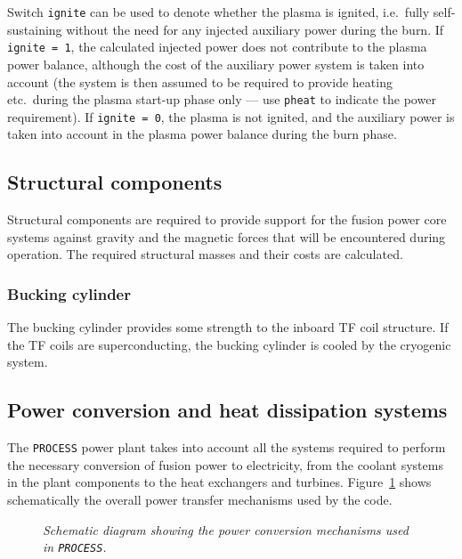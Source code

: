 \documentclass[11pt,a4paper]{report}
\newcommand{\process}{\mbox{\texttt{PROCESS}}}
\begin{document}
Switch \texttt{ignite} can be used to denote whether the plasma is ignited,
i.e.\ fully self-sustaining without the need for any injected auxiliary power
during the burn. If \texttt{ignite = 1}, the calculated injected power does not
contribute to the plasma power balance, although the cost of the auxiliary
power system is taken into account (the system is then assumed to be required to
provide heating etc.\ during the plasma start-up phase only --- use
\texttt{pheat} to indicate the power requirement). If
\texttt{ignite = 0}, the plasma is not ignited, and the auxiliary power is
taken into account in the plasma power balance during the burn phase.

\subsection{Structural components}

Structural components are required to provide support for the fusion power
core systems against gravity and the magnetic forces that will be encountered
during operation. The required structural masses and their costs are
calculated.

\subsubsection{Bucking cylinder}

The bucking cylinder provides some strength to the inboard TF coil
structure. If the TF coils are superconducting, the bucking cylinder is cooled
by the cryogenic system.

\subsection{Power conversion and heat dissipation systems}

The \process\/ power plant takes into account all the systems required to
perform the necessary conversion of fusion power to electricity, from the
coolant systems in the plant components to the heat exchangers and turbines.
Figure~\ref{fig:pwrconv} shows schematically the overall power transfer
mechanisms used by the code.

\begin{figure}[tbph]
\centerline{}
\vspace{-12mm}
\caption[Power conversion mechanisms within \process]
{\label{fig:pwrconv}
  \textit{Schematic diagram showing the power conversion mechanisms used in
    \process \cite[Note 0166]{PWF}.}
}
\end{figure}
\end{document}

